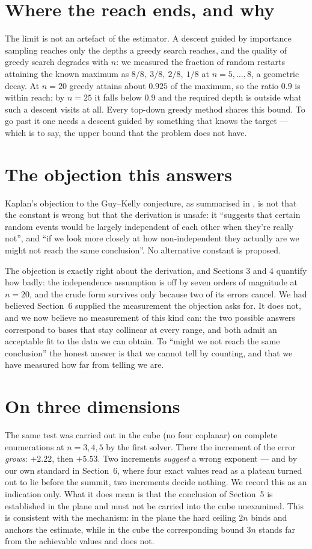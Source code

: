 \documentclass[11pt,a4paper]{article}
\begin{document}
\section{Where the reach ends, and why}
The limit is not an artefact of the estimator.  A descent guided by importance sampling reaches
only the depths a greedy search reaches, and the quality of greedy search degrades with $n$: we
measured the fraction of random restarts attaining the known maximum as $8/8,\ 3/8,\ 2/8,\ 1/8$
at $n=5,\dots,8$, a geometric decay.  At $n=20$ greedy attains about $0.925$ of the maximum, so
the ratio $0.9$ is within reach; by $n=25$ it falls below $0.9$ and the required depth is outside
what such a descent visits at all.  Every top-down greedy method shares this bound.  To go past it
one needs a descent guided by something that knows the target --- which is to say, the upper bound
that the problem does not have.

\section{The objection this answers}
Kaplan's objection to the Guy--Kelly conjecture, as summarised in \cite{Kaplan}, is not that the
constant is wrong but that the derivation is unsafe: it ``suggests that certain random events would
be largely independent of each other when they're really not'', and ``if we look more closely at
how non-independent they actually are we might not reach the same conclusion''.  No alternative
constant is proposed.

The objection is exactly right about the derivation, and Sections 3 and 4 quantify how badly:
the independence assumption is off by seven orders of magnitude at $n=20$, and the crude form
survives only because two of its errors cancel.  We had believed Section~6 supplied the
measurement the objection asks for.  It does not, and we now believe no measurement of this kind
can: the two possible answers correspond to bases that stay collinear at every range, and both
admit an acceptable fit to the data we can obtain.  To ``might we not reach the same conclusion''
the honest answer is that we cannot tell by counting, and that we have measured how far from
telling we are.

\section{On three dimensions}
The same test was carried out in the cube (no four coplanar) on complete enumerations at
$n=3,4,5$ by the first solver.  There the increment of the error \emph{grows}: $+2.22$, then
$+5.53$.  Two increments \emph{suggest} a wrong exponent --- and by our own standard in
Section~6, where four exact values read as a plateau turned out to lie before the summit, two
increments decide nothing.  We record this as an indication only.  What it does mean is that the
conclusion of Section~5 is established in the plane and must not be carried into the cube
unexamined.  This is consistent with the
mechanism: in the plane the hard ceiling $2n$ binds and anchors the estimate, while in the cube the
corresponding bound $3n$ stands far from the achievable values and does not.
\end{document}
